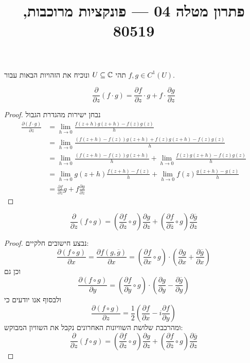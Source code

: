 
\title{פתרון מטלה 04 --- פונקציות מרוכבות, 80519}


\maketitle
\maketitleprint{}

\Question{}
תהי $U \subseteq \mathbb{C}$ ונוכיח את הזהויות הבאות עבור $f, g \in C^1(U)$.

\Subquestion{}
\[
	\frac{\partial}{\partial z}(f \cdot g) = \frac{\partial f}{\partial z} \cdot g + f \cdot \frac{\partial g}{\partial z}
\]
\begin{proof}
	נבחן ישירות מהגדרת הגבול
	\begin{align*}
		\frac{\partial (f \cdot g)}{\partial z}
		& = \lim_{h \to 0} \frac{f(z + h) g(z + h) - f(z) g(z)}{h} \\
		& = \lim_{h \to 0} \frac{(f(z + h) - f(z)) g(z + h) + f(z) g(z + h) - f(z) g(z)}{h} \\
		& = \lim_{h \to 0} \frac{(f(z + h) - f(z)) g(z + h)}{h} + \lim_{h \to 0} \frac{f(z) g(z + h) - f(z) g(z)}{h} \\
		& = \lim_{h \to 0} g(z + h) \frac{f(z + h) - f(z)}{h} + \lim_{h \to 0} f(z) \frac{g(z + h) - g(z)}{h} \\
		& = \frac{\partial f}{\partial z} g + f \frac{\partial g}{\partial z}
	\end{align*}
\end{proof}

\Subquestion{}
\[
	\frac{\partial}{\partial z} (f \circ g)
	= \left( \frac{\partial f}{\partial z} \circ g \right) \frac{\partial g}{\partial z} + \left( \frac{\partial f}{\partial \overline{z}} \circ g \right) \frac{\partial \overline{g}}{\partial z}
\]
\begin{proof}
	נבצע חישובים חלקיים:
	\[
		\frac{\partial (f \circ g)}{\partial x}
		= \frac{\partial f(g, \overline{g})}{\partial x}
		= \left(\frac{\partial f}{\partial x} \circ g\right) \cdot \left(\frac{\partial g}{\partial x} + \frac{\partial \overline{g}}{\partial x}\right)
	\]
	וכן גם
	\[
		\frac{\partial (f \circ g)}{\partial y}
		= \left(\frac{\partial f}{\partial y} \circ g\right) \cdot \left(\frac{\partial g}{\partial y} - \frac{\partial \overline{g}}{\partial y}\right)
	\]
	ולבסוף אנו יודעים כי
	\[
		\frac{\partial (f \circ g)}{\partial z}
		= \frac{1}{2} \left(\frac{\partial f}{\partial x} - i \frac{\partial f}{\partial y}\right)
	\]
	ומהרכבת שלושת השוויונות האחרונים נקבל את השוויון המבוקש:
	\[
		\frac{\partial}{\partial z} (f \circ g)
		= \left( \frac{\partial f}{\partial z} \circ g \right) \frac{\partial g}{\partial z} + \left( \frac{\partial f}{\partial \overline{z}} \circ g \right) \frac{\partial \overline{g}}{\partial z}
	\]
\end{proof}

